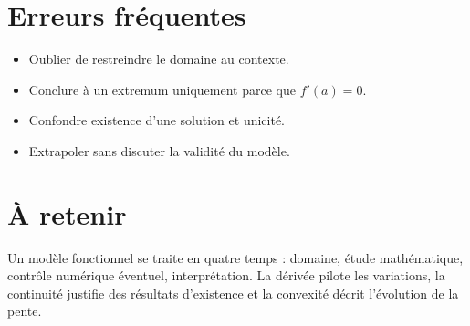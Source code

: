 \section{Erreurs fréquentes}
\begin{itemize}
\item Oublier de restreindre le domaine au contexte.
\item Conclure à un extremum uniquement parce que $f'(a)=0$.
\item Confondre existence d'une solution et unicité.
\item Extrapoler sans discuter la validité du modèle.
\end{itemize}
\section{À retenir}
\begin{aretenir}
Un modèle fonctionnel se traite en quatre temps : domaine, étude mathématique, contrôle numérique éventuel, interprétation. La dérivée pilote les variations, la continuité justifie des résultats d'existence et la convexité décrit l'évolution de la pente.
\end{aretenir}
